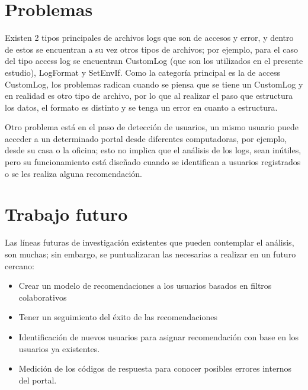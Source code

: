 \section{Problemas}\label{Problemas que pueden surgir}

Existen 2 tipos principales de archivos logs que son de accesos y error, y dentro de estos se encuentran a su vez otros tipos de archivos; 
por ejemplo, para el caso del tipo access log se encuentran CustomLog (que son los utilizados en el presente estudio), LogFormat y SetEnvIf.
Como la categoría principal es la de access CustomLog, los problemas radican cuando se piensa que se tiene un CustomLog y en realidad es otro tipo de archivo, por lo que al realizar el paso que estructura los datos, el formato es distinto y se tenga un error en cuanto a estructura.

Otro problema está en el paso de detección de usuarios, un mismo usuario puede acceder a un determinado portal desde diferentes computadoras, por ejemplo, desde su casa o la oficina; esto no implica que el análisis de los logs, sean inútiles, pero su funcionamiento está diseñado cuando se identifican a usuarios  registrados o se les realiza alguna recomendación.



\section{Trabajo futuro}\label{trabajo futuro}

Las líneas futuras de investigación existentes que pueden contemplar el análisis, son muchas; sin embargo, se puntualizaran las necesarias a realizar en un futuro cercano:

\begin{itemize}
\item Crear un modelo de recomendaciones a los usuarios basados en filtros colaborativos
\item Tener un seguimiento del éxito de las recomendaciones
\item Identificación de nuevos usuarios para asignar recomendación con base en los usuarios ya existentes.
\item Medición de los códigos de respuesta para conocer posibles errores internos del portal.
\end{itemize}